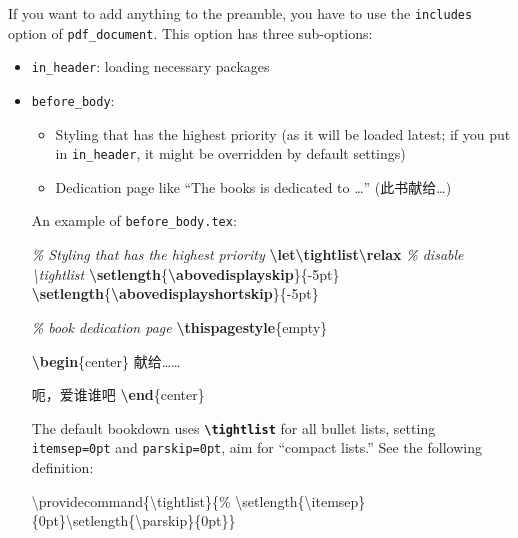 \documentclass[
  a4paper,
  twoside,
  openright]{book}
\newenvironment{Shaded}{\begin{snugshade}}{\end{snugshade}}
\newcommand{\CommentTok}[1]{\textcolor[rgb]{0.56,0.35,0.01}{\textit{#1}}}
\newcommand{\DecValTok}[1]{\textcolor[rgb]{0.00,0.00,0.81}{#1}}
\newcommand{\ExtensionTok}[1]{#1}
\newcommand{\FunctionTok}[1]{\textcolor[rgb]{0.13,0.29,0.53}{\textbf{#1}}}
\newcommand{\KeywordTok}[1]{\textcolor[rgb]{0.13,0.29,0.53}{\textbf{#1}}}
\newcommand{\NormalTok}[1]{#1}
\providecommand{\tightlist}{%
  \setlength{\itemsep}{0pt}\setlength{\parskip}{0pt}}
\theoremstyle{definition}
\theoremstyle{definition}
\theoremstyle{definition}
\theoremstyle{definition}
\theoremstyle{remark}
\begin{document}
If you want to add anything to the preamble, you have to use the \texttt{includes} option of \texttt{pdf\_document}. This option has three sub-options:

\begin{itemize}
\item
  \texttt{in\_header}: loading necessary packages
\item
  \texttt{before\_body}:

  \begin{itemize}
  \tightlist
  \item
    Styling that has the highest priority (as it will be loaded latest; if you put in \texttt{in\_header}, it might be overridden by default settings)
  \item
    Dedication page like ``The books is dedicated to \ldots{}'' (此书献给\ldots)
  \end{itemize}

  An example of \texttt{before\_body.tex}:

\begin{Shaded}
\begin{Highlighting}[]
\CommentTok{\% Styling that has the highest priority}
\FunctionTok{\textbackslash{}let\textbackslash{}tightlist\textbackslash{}relax} \CommentTok{\% disable \textasciigrave{}\textbackslash{}tightlist\textasciigrave{}}
\FunctionTok{\textbackslash{}setlength}\NormalTok{\{}\FunctionTok{\textbackslash{}abovedisplayskip}\NormalTok{\}\{{-}5pt\}}
\FunctionTok{\textbackslash{}setlength}\NormalTok{\{}\FunctionTok{\textbackslash{}abovedisplayshortskip}\NormalTok{\}\{{-}5pt\}}

\CommentTok{\% book dedication page}
\FunctionTok{\textbackslash{}thispagestyle}\NormalTok{\{empty\}}

\KeywordTok{\textbackslash{}begin}\NormalTok{\{}\ExtensionTok{center}\NormalTok{\}}
\NormalTok{献给……}

\NormalTok{呃，爱谁谁吧}
\KeywordTok{\textbackslash{}end}\NormalTok{\{}\ExtensionTok{center}\NormalTok{\}}
\end{Highlighting}
\end{Shaded}

  The default bookdown uses {\textbf{\texttt{\textbackslash{}tightlist}}} for all bullet lists, setting \texttt{itemsep=0pt} and \texttt{parskip=0pt}, aim for ``compact lists.'' See the following definition:

\begin{Shaded}
\begin{Highlighting}[]
\NormalTok{\textbackslash{}providecommand\{\textbackslash{}tightlist\}\{\%}
\NormalTok{\textbackslash{}setlength\{\textbackslash{}itemsep\}\{}\DecValTok{0}\NormalTok{pt\}\textbackslash{}setlength\{\textbackslash{}parskip\}\{}\DecValTok{0}\NormalTok{pt\}\}}
\end{Highlighting}
\end{Shaded}


\end{itemize}
\end{document}
